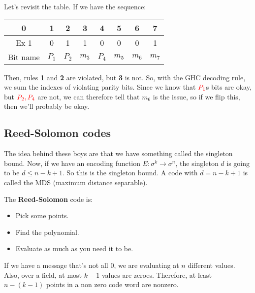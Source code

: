 \documentclass[11pt,a4paper,titlepage,dvipsnames,cmyk]{scrartcl}
\begin{document}
Let's revisit the table. If we have the sequence:
\begin{center}
    \begin{tabular}{c|c c c c c c c}
        0 & 1 & 2 & 3 & 4 & 5 & 6 & 7 \\
        \hline
        Ex 1 & 0 & 1 & 1 & 0 & 0 & 0 & 1 \\
        \hline
        Bit name & $P_1$& $P_2$& $m_3$& $P_4$& $m_5$& $m_6$& $m_7$
    \end{tabular}
\end{center}

Then, rules \textbf{1} and \textbf{2} are violated, but \textbf{3} is not.
So, with the GHC decoding rule, we sum the indexes of violating parity
bits. Since we know that ${\color{red}P_1}$s bits are okay, but
${\color{red}P_2, P_4}$ are not, we can therefore tell that $m_6$ is the
issue, so if we flip this, then we'll probably be okay.

\subsection{Reed-Solomon codes}%
\label{sub:reed-solomon}
The idea behind these boys are that we have something called the singleton
bound. Now, if we have an encoding function $E:\sigma^k \rightarrow
\sigma^n$, the singleton $d$ is going to be $d \le n-k+1$. So this is the
singleton bound. A code with $d = n - k + 1$ is called the MDS (maximum
distance separable).

The \textbf{Reed-Solomon} code is:
\begin{itemize}
    \item Pick some points.
    \item Find the polynomial.
    \item Evaluate as much as you need it to be.
\end{itemize}

If we have a message that's not all 0, we are evaluating at $n$ different
values. Also, over a field, at most $k-1$ values are zeroes. Therefore, at
least $n-(k-1)$ points in a non zero code word are nonzero.
\end{document}
